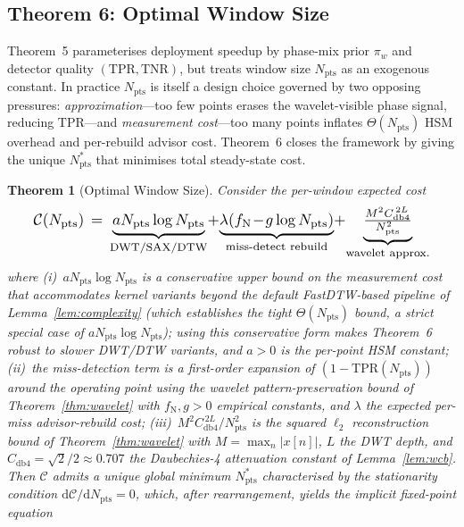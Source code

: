 \documentclass[10pt,journal,compsoc]{IEEEtran}
\newtheorem{theorem}{Theorem}
\newcommand{\Nstar}{N^{*}_{\mathrm{pts}}}
\newcommand{\Npts}{N_{\mathrm{pts}}}
\newcommand{\TPR}{\mathrm{TPR}}
\newcommand{\TNR}{\mathrm{TNR}}
\begin{document}
\subsection{Theorem 6: Optimal Window Size}

Theorem~5 parameterises deployment speedup by phase-mix prior $\pi_w$
and detector quality $(\TPR,\TNR)$, but treats window size $\Npts$ as
an exogenous constant. In practice $\Npts$ is itself a design choice
governed by two opposing pressures: \emph{approximation}---too few
points erases the wavelet-visible phase signal, reducing
$\TPR$---and \emph{measurement cost}---too many points inflates
$\Theta(\Npts)$ HSM overhead and per-rebuild advisor cost. Theorem~6
closes the framework by giving the unique $\Nstar$ that minimises
total steady-state cost.

\begin{theorem}[Optimal Window Size]\label{thm:optwin}
Consider the per-window expected cost
\begin{equation}\label{eq:optwin-cost}
\resizebox{0.92\columnwidth}{!}{$\displaystyle
\mathcal{C}(\Npts)\,=\,\underbrace{a\Npts\log\Npts}_{\text{DWT/SAX/DTW}}
\!+\!\underbrace{\lambda(f_{\mathrm{N}}\!-\!g\log\Npts)}_{\text{miss-detect rebuild}}
\!+\!\underbrace{\tfrac{M^{2}C_{\mathrm{db4}}^{\,2L}}{\Npts^{2}}}_{\text{wavelet approx.}}$}
\end{equation}
where (i)~$a\Npts\log \Npts$ is a conservative upper bound on the
measurement cost that accommodates kernel variants beyond the default
FastDTW-based pipeline of Lemma~\ref{lem:complexity} (which establishes
the tight $\Theta(\Npts)$ bound, a strict special case of
$a\Npts\log \Npts$); using this conservative form makes Theorem~6
robust to slower DWT/DTW variants, and $a\!>\!0$ is the per-point
HSM constant; (ii)~the
miss-detection term is a first-order expansion of
$(1\!-\!\TPR(\Npts))$ around the operating point using the wavelet
pattern-preservation bound of Theorem~\ref{thm:wavelet} with
$f_{\mathrm{N}},g\!>\!0$ empirical constants, and $\lambda$ the
expected per-miss advisor-rebuild cost; (iii)~$M^{2}C_{\mathrm{db4}}^{\,2L}/\Npts^{2}$
is the squared $\ell_{2}$ reconstruction bound of
Theorem~\ref{thm:wavelet} with $M\!=\!\max_{n}|x[n]|$, $L$ the DWT
depth, and $C_{\mathrm{db4}}\!=\!\sqrt{2}/2\!\approx\!0.707$ the
Daubechies-4 attenuation constant of Lemma~\ref{lem:wcb}.
Then $\mathcal{C}$ admits a unique global minimum
$\Nstar$ characterised by the stationarity condition
$\mathrm{d}\mathcal{C}/\mathrm{d}\Npts\!=\!0$, which, after rearrangement,
yields the implicit fixed-point equation

\end{theorem}
\end{document}
